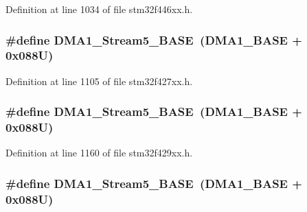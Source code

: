 Definition at line 1034 of file stm32f446xx.\+h.

\subsubsection[{\texorpdfstring{D\+M\+A1\+\_\+\+Stream5\+\_\+\+B\+A\+SE}{DMA1_Stream5_BASE}}]{\setlength{\rightskip}{0pt plus 5cm}\#define D\+M\+A1\+\_\+\+Stream5\+\_\+\+B\+A\+SE~({\bf D\+M\+A1\+\_\+\+B\+A\+SE} + 0x088\+U)}\hypertarget{group___peripheral__memory__map_ga0ded7bed8969fe2e2d616e7f90eb7654}{}\label{group___peripheral__memory__map_ga0ded7bed8969fe2e2d616e7f90eb7654}


Definition at line 1105 of file stm32f427xx.\+h.

\subsubsection[{\texorpdfstring{D\+M\+A1\+\_\+\+Stream5\+\_\+\+B\+A\+SE}{DMA1_Stream5_BASE}}]{\setlength{\rightskip}{0pt plus 5cm}\#define D\+M\+A1\+\_\+\+Stream5\+\_\+\+B\+A\+SE~({\bf D\+M\+A1\+\_\+\+B\+A\+SE} + 0x088\+U)}\hypertarget{group___peripheral__memory__map_ga0ded7bed8969fe2e2d616e7f90eb7654}{}\label{group___peripheral__memory__map_ga0ded7bed8969fe2e2d616e7f90eb7654}


Definition at line 1160 of file stm32f429xx.\+h.

\subsubsection[{\texorpdfstring{D\+M\+A1\+\_\+\+Stream5\+\_\+\+B\+A\+SE}{DMA1_Stream5_BASE}}]{\setlength{\rightskip}{0pt plus 5cm}\#define D\+M\+A1\+\_\+\+Stream5\+\_\+\+B\+A\+SE~({\bf D\+M\+A1\+\_\+\+B\+A\+SE} + 0x088\+U)}\hypertarget{group___peripheral__memory__map_ga0ded7bed8969fe2e2d616e7f90eb7654}{}\label{group___peripheral__memory__map_ga0ded7bed8969fe2e2d616e7f90eb7654}


